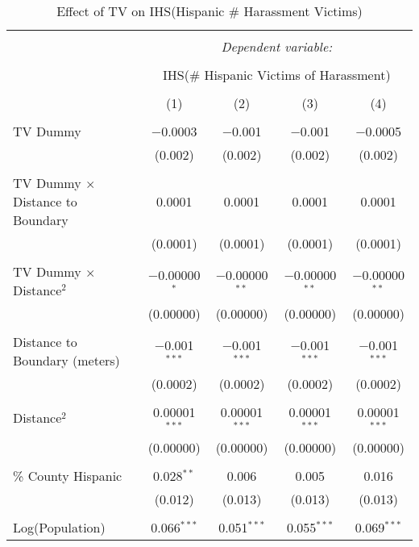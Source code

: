 
\begin{table}[!htbp] \centering 
  \caption{Effect of TV on IHS(Hispanic \# Harassment Victims)} 
  \label{} 
\begin{tabular}{@{\extracolsep{-2pt}}lcccc} 
\\[-1.8ex]\hline 
\hline \\[-1.8ex] 
 & \multicolumn{4}{c}{\textit{Dependent variable:}} \\ 
\cline{2-5} 
\\[-1.8ex] & \multicolumn{4}{c}{IHS(\# Hispanic Victims of Harassment)} \\ 
\\[-1.8ex] & (1) & (2) & (3) & (4)\\ 
\hline \\[-1.8ex] 
 TV Dummy & $-$0.0003 & $-$0.001 & $-$0.001 & $-$0.0005 \\ 
  & (0.002) & (0.002) & (0.002) & (0.002) \\ 
  & & & & \\ 
 TV Dummy $\times$ Distance to Boundary & 0.0001 & 0.0001 & 0.0001 & 0.0001 \\ 
  & (0.0001) & (0.0001) & (0.0001) & (0.0001) \\ 
  & & & & \\ 
 TV Dummy $\times$ Distance$^{2}$ & $-$0.00000$^{*}$ & $-$0.00000$^{**}$ & $-$0.00000$^{**}$ & $-$0.00000$^{**}$ \\ 
  & (0.00000) & (0.00000) & (0.00000) & (0.00000) \\ 
  & & & & \\ 
 Distance to Boundary (meters) & $-$0.001$^{***}$ & $-$0.001$^{***}$ & $-$0.001$^{***}$ & $-$0.001$^{***}$ \\ 
  & (0.0002) & (0.0002) & (0.0002) & (0.0002) \\ 
  & & & & \\ 
 Distance$^{2}$ & 0.00001$^{***}$ & 0.00001$^{***}$ & 0.00001$^{***}$ & 0.00001$^{***}$ \\ 
  & (0.00000) & (0.00000) & (0.00000) & (0.00000) \\ 
  & & & & \\ 
 \% County Hispanic & 0.028$^{**}$ & 0.006 & 0.005 & 0.016 \\ 
  & (0.012) & (0.013) & (0.013) & (0.013) \\ 
  & & & & \\ 
 Log(Population) & 0.066$^{***}$ & 0.051$^{***}$ & 0.055$^{***}$ & 0.069$^{***}$ \\ 

\end{tabular}
\end{table}
